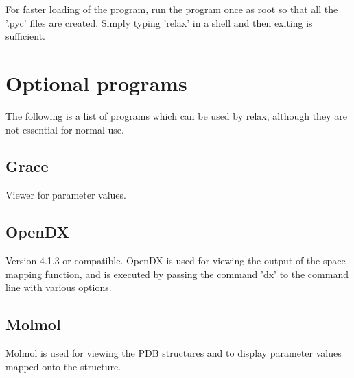 For faster loading of the program, run the program once as root so that all the '.pyc' files are
created.  Simply typing 'relax' in a shell and then exiting is sufficient.




\section{Optional programs}

The following is a list of programs which can be used by relax, although they are not essential for
normal use.


\subsection{Grace}

Viewer for parameter values.


\subsection{OpenDX}

Version 4.1.3 or compatible.  OpenDX is used for viewing the output of the space mapping function,
and is executed by passing the command 'dx' to the command line with various options.


\subsection{Molmol}

Molmol is used for viewing the PDB structures and to display parameter values mapped onto the
structure.
